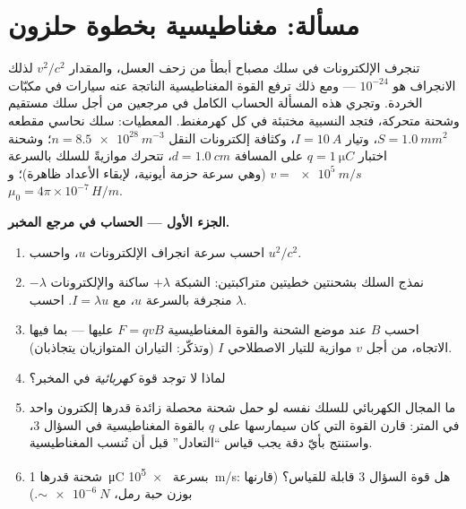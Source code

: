 \section{مسألة: مغناطيسية بخطوة حلزون}

\begin{problem}\label{pb:b3:covariant-electromagnetism:1}
تنجرف الإلكترونات في سلك مصباح أبطأ من زحف العسل،
والمقدار $v^2/c^2$ لذلك الانجراف هو $10^{-24}$ --- ومع ذلك ترفع القوة
المغناطيسية الناتجة عنه سيارات في مكبّات الخردة. وتجري هذه المسألة
الحساب الكامل في مرجعين من أجل سلك مستقيم وشحنة متحركة،
فتجد النسبية مختبئة في كل كهرمغنط. المعطيات: سلك نحاسي
مقطعه $S = \qty{1.0}{mm^2}$، وتيار $I = \qty{10}{A}$،
وكثافة إلكترونات النقل $n = \qty{8.5e28}{m^{-3}}$؛ وشحنة اختبار
$q = \qty{1}{\micro C}$ على المسافة $d = \qty{1.0}{cm}$، تتحرك
موازيةً للسلك بالسرعة $v = \qty{e5}{m/s}$ (وهي سرعة حزمة أيونية، لإبقاء
الأعداد ظاهرة)؛ و $\mu_0 = 4\pi\times10^{-7}\,\unit{H/m}$.

\medskip\noindent\textbf{الجزء الأول --- الحساب في مرجع المخبر.}
\begin{enumerate}
  \item احسب سرعة انجراف الإلكترونات $u$، واحسب $u^2/c^2$.
  \item نمذج السلك بشحنتين خطيتين متراكبتين: الشبكة
        $+\lambda$ ساكنة والإلكترونات $-\lambda$ منجرفة بالسرعة
        $u$، مع $I = \lambda u$. احسب $\lambda$.
  \item احسب $B$ عند موضع الشحنة والقوة المغناطيسية
        $F = qvB$ عليها --- بما فيها الاتجاه، من أجل $v$ موازية
        للتيار الاصطلاحي $I$ (وتذكّر: التياران المتوازيان
        يتجاذبان).
  \item لماذا لا توجد قوة \emph{كهربائية} في المخبر؟
  \item ما المجال الكهربائي للسلك نفسه لو حمل شحنة محصلة
        زائدة قدرها إلكترون واحد في المتر: قارن القوة التي
        كان سيمارسها على $q$ بالقوة المغناطيسية في السؤال 3،
        واستنتج بأيّ دقة يجب قياس ``التعادل''
        قبل أن تُنسب المغناطيسية.
  \item شحنة قدرها \qty{1}{\micro C} بسرعة \qty{e5}{m/s}: هل قوة
        السؤال 3 قابلة للقياس؟ (قارنها بوزن حبة
        رمل، $\sim\qty{e-6}{N}$.)
\end{enumerate}


\end{problem}
